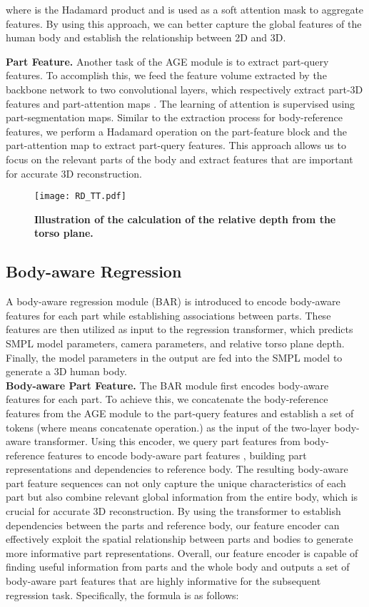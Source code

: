 \documentclass[10pt,twocolumn,letterpaper]{article}
\begin{document}
where  is the Hadamard product and  is used as a soft attention mask to aggregate features. By using this approach, we can better capture the global features of the human body and establish the relationship between 2D and 3D.

\noindent\textbf{Part Feature.}
Another task of the AGE module is to extract part-query features. To accomplish this, we feed the feature volume extracted by the backbone network to two convolutional layers, which respectively extract part-3D features  and part-attention maps . The learning of attention is supervised using part-segmentation maps. Similar to the extraction process for body-reference features, we perform a Hadamard operation on the part-feature block and the part-attention map to extract part-query features. This approach allows us to focus on the relevant parts of the body and extract features that are important for accurate 3D reconstruction.

\begin{figure}
  \centering
  \texttt{[image: RD\_TT.pdf]}
  \vspace{-1em}
  \caption{\noindent\textbf{Illustration of the calculation of the relative depth from the torso plane.} }
  \label{rp}
\end{figure}

\subsection{Body-aware Regression}
A body-aware regression module (BAR) is introduced to encode body-aware features for each part while establishing associations between parts. These features are then utilized as input to the regression transformer, which predicts SMPL model parameters, camera parameters, and relative torso plane depth. Finally, the model parameters in the output are fed into the SMPL model to generate a 3D human body.
 \\
\noindent\textbf{Body-aware Part Feature.}
The BAR module first encodes body-aware features for each part. To achieve this, we concatenate the body-reference features from the AGE module to the part-query features and establish a set of tokens (where  means concatenate operation.) as the input of the two-layer body-aware transformer. Using this encoder, we query part features from body-reference features to encode body-aware part features , building part representations and dependencies to reference body. The resulting body-aware part feature sequences can  not only capture the unique characteristics of each part but also combine relevant global information from the entire body, which is crucial for accurate 3D reconstruction. By using the transformer to establish dependencies between the parts and reference body, our feature encoder can effectively exploit the spatial relationship between parts and bodies to generate more informative part representations. Overall, our feature encoder is capable of finding useful information from parts and the whole body and outputs a set of body-aware part features that are highly informative for the subsequent regression task. Specifically, the formula is as follows:
\end{document}
